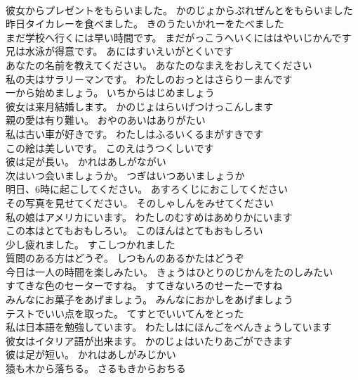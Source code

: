 \documentclass[8pt]{extreport}
\begin{document}
\begin{CJK}{UTF8}{min}
\\	彼女からプレゼントをもらいました。	かのじょからぷれぜんとをもらいました 
\\	昨日タイカレーを食べました。	きのうたいかれーをたべました 
\\	まだ学校へ行くには早い時間です。	まだがっこうへいくにははやいじかんです 
\\	兄は水泳が得意です。	あにはすいえいがとくいです 
\\	あなたの名前を教えてください。	あなたのなまえをおしえてください 
\\	私の夫はサラリーマンです。	わたしのおっとはさらりーまんです 
\\	一から始めましょう。	いちからはじめましょう 
\\	彼女は来月結婚します。	かのじょはらいげつけっこんします 
\\	親の愛は有り難い。	おやのあいはありがたい 
\\	私は古い車が好きです。	わたしはふるいくるまがすきです 
\\	この絵は美しいです。	このえはうつくしいです 
\\	彼は足が長い。	かれはあしがながい 
\\	次はいつ会いましょうか。	つぎはいつあいましょうか 
\\	明日、6時に起こしてください。	あすろくじにおこしてください 
\\	その写真を見せてください。	そのしゃしんをみせてください 
\\	私の娘はアメリカにいます。	わたしのむすめはあめりかにいます 
\\	この本はとてもおもしろい。	このほんはとてもおもしろい 
\\	少し疲れました。	すこしつかれました 
\\	質問のある方はどうぞ。	しつもんのあるかたはどうぞ 
\\	今日は一人の時間を楽しみたい。	きょうはひとりのじかんをたのしみたい 
\\	すてきな色のセーターですね。	すてきないろのせーたーですね 
\\	みんなにお菓子をあげましょう。	みんなにおかしをあげましょう 
\\	テストでいい点を取った。	てすとでいいてんをとった 
\\	私は日本語を勉強しています。	わたしはにほんごをべんきょうしています 
\\	彼女はイタリア語が出来ます。	かのじょはいたりあごができます 
\\	彼は足が短い。	かれはあしがみじかい 
\\	猿も木から落ちる。	さるもきからおちる 

\end{CJK}
\end{document}
